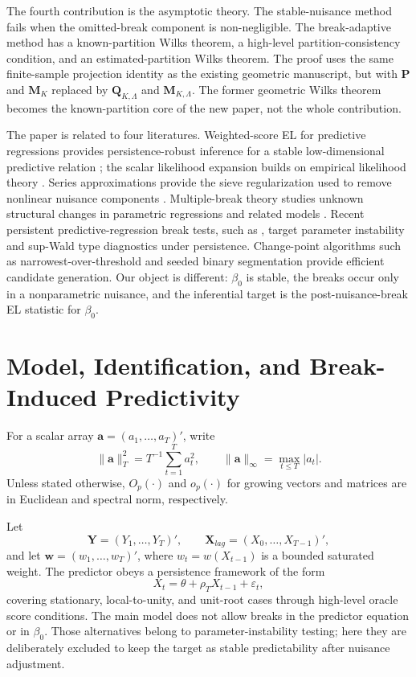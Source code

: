 \documentclass[12pt]{article} %
\numberwithin{equation}{section}
\theoremstyle{definition}
\begin{document}
The fourth contribution is the asymptotic theory. The stable-nuisance method fails when the omitted-break component is non-negligible. The break-adaptive method has a known-partition Wilks theorem, a high-level partition-consistency condition, and an estimated-partition Wilks theorem. The proof uses the same finite-sample projection identity as the existing geometric manuscript, but with \(\bm P\) and \(\bm M_K\) replaced by \(\bm Q_{K,\Lambda}\) and \(\bm M_{K,\Lambda}\). The former geometric Wilks theorem becomes the known-partition core of the new paper, not the whole contribution.

The paper is related to four literatures. Weighted-score EL for predictive regressions provides persistence-robust inference for a stable low-dimensional predictive relation \citep{ZhuCaiPeng2014}; the scalar likelihood expansion builds on empirical likelihood theory \citep{Owen1988,Owen2001,QinLawless1994}. Series approximations provide the sieve regularization used to remove nonlinear nuisance components \citep{Newey1997}. Multiple-break theory studies unknown structural changes in parametric regressions and related models \citep{Andrews1993,BaiPerron1998}. Recent persistent predictive-regression break tests, such as \citet{AndersenVarneskov2021}, target parameter instability and sup-Wald type diagnostics under persistence. Change-point algorithms such as narrowest-over-threshold and seeded binary segmentation \citep{BaranowskiChenFryzlewicz2019,KovacsLiBuhlmannMunk2023} provide efficient candidate generation. Our object is different: \(\beta_0\) is stable, the breaks occur only in a nonparametric nuisance, and the inferential target is the post-nuisance-break EL statistic for \(\beta_0\).

\section{Model, Identification, and Break-Induced Predictivity}
\label{sec:model}

For a scalar array \(\bm a=(a_1,\ldots,a_T)'\), write
\[
    \|\bm a\|_T^2
    =
    T^{-1}\sum_{t=1}^T a_t^2,
    \qquad
    \|\bm a\|_\infty=\max_{t\leq T}|a_t|.
\]
Unless stated otherwise, \(O_p(\cdot)\) and \(o_p(\cdot)\) for growing
vectors and matrices are in Euclidean and spectral norm, respectively.

Let
\[
    \bm Y=(Y_1,\ldots,Y_T)',\qquad
    \bm X_{lag}=(X_0,\ldots,X_{T-1})',
\]
and let \(\bm w=(w_1,\ldots,w_T)'\), where \(w_t=w(X_{t-1})\) is a bounded saturated weight. The predictor obeys a persistence framework of the form
\begin{equation}
    X_t=\theta+\rho_TX_{t-1}+\varepsilon_t,
    \label{eq:predictor}
\end{equation}
covering stationary, local-to-unity, and unit-root cases through high-level oracle score conditions. The main model does not allow breaks in the predictor equation or in \(\beta_0\). Those alternatives belong to parameter-instability testing; here they are deliberately excluded to keep the target as stable predictability after nuisance adjustment.
\end{document}

